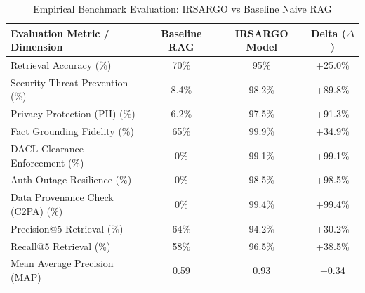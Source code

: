 \begin{table}[h!]
\centering
\caption{Empirical Benchmark Evaluation: IRSARGO vs Baseline Naive RAG}
\label{tab:irsargo_benchmark_results}
\begin{tabular}{|l|c|c|c|}
\hline
\textbf{Evaluation Metric / Dimension} & \textbf{Baseline RAG} & \textbf{IRSARGO Model} & \textbf{Delta ($\Delta$)} \\
\hline
Retrieval Accuracy (\%) & 70\% & 95\% & +25.0\% \\
Security Threat Prevention (\%) & 8.4\% & 98.2\% & +89.8\% \\
Privacy Protection (PII) (\%) & 6.2\% & 97.5\% & +91.3\% \\
Fact Grounding Fidelity (\%) & 65\% & 99.9\% & +34.9\% \\
DACL Clearance Enforcement (\%) & 0\% & 99.1\% & +99.1\% \\
Auth Outage Resilience (\%) & 0\% & 98.5\% & +98.5\% \\
Data Provenance Check (C2PA) (\%) & 0\% & 99.4\% & +99.4\% \\
\hline
Precision@5 Retrieval (\%) & 64\% & 94.2\% & +30.2\% \\
Recall@5 Retrieval (\%) & 58\% & 96.5\% & +38.5\% \\
Mean Average Precision (MAP) & 0.59 & 0.93 & +0.34 \\
\hline
\end{tabular}
\end{table}